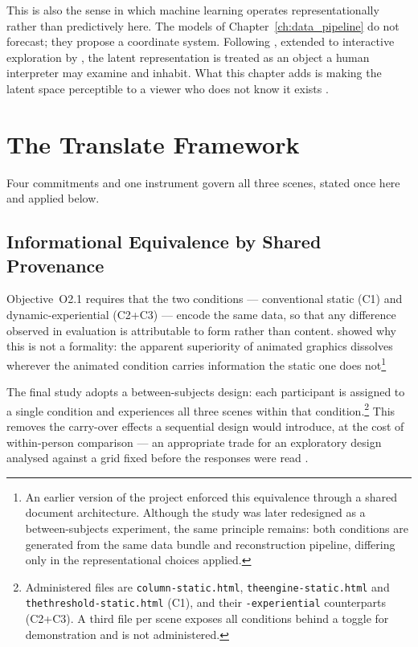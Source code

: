This is also the sense in which machine learning operates representationally rather than predictively here. The models of Chapter~\ref{ch:data_pipeline} do not forecast; they propose a coordinate system. Following \textcite{iten2020}, extended to interactive exploration by \textcite{camps2019}, the latent representation is treated as an object a human interpreter may examine and inhabit. What this chapter adds is making the latent space perceptible to a viewer who does not know it exists \parencite{sacha2018}.

\section{The Translate Framework}
\label{sec:translate-framework}

Four commitments and one instrument govern all three scenes, stated once here and applied below.

\subsection{Informational Equivalence by Shared Provenance}
\label{subsec:equivalence}

Objective~O2.1 requires that the two conditions --- conventional static (C1) and dynamic-experiential (C2+C3) --- encode the same data, so that any difference observed in evaluation is attributable to form rather than content. \textcite{tversky2002} showed why this is not a formality: the apparent superiority of animated graphics dissolves wherever the animated condition carries information the static one does not\footnote{An earlier version of the project enforced this equivalence through a shared document architecture. Although the study was later redesigned as a between-subjects experiment, the same principle remains: both conditions are generated from the same data bundle and reconstruction pipeline, differing only in the representational choices applied.}

The final study adopts a between-subjects design: each participant is assigned to a single condition and experiences all three scenes within that condition.\footnote{Administered files are \texttt{column-static.html}, \texttt{theengine-static.html} and \texttt{thethreshold-static.html} (C1), and their \texttt{-experiential} counterparts (C2+C3). A third file per scene exposes all conditions behind a toggle for demonstration and is not administered.} This removes the carry-over effects a sequential design would introduce, at the cost of within-person comparison --- an appropriate trade for an exploratory design analysed against a grid fixed before the responses were read \parencite{braunclarke2019}.

